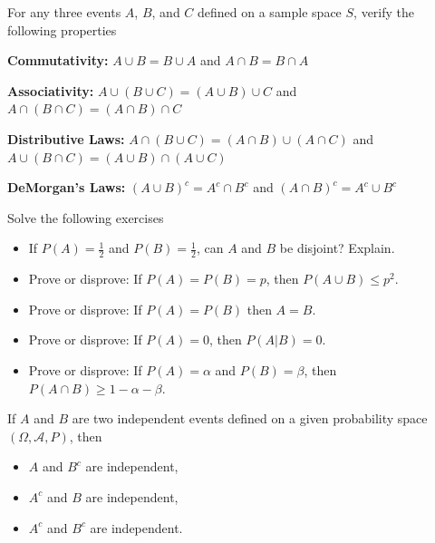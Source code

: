 \begin{Ejer} For any three events $A$, $B$, and $C$ defined on a sample space $S$, verify the following properties 

\textbf{Commutativity:} $A \cup B = B \cup A$ and $A \cap B = B \cap A$

\textbf{Associativity:} $A \cup (B \cup C) = (A \cup B) \cup C$ and $A \cap (B \cap C) = (A \cap B) \cap C$

\textbf{Distributive Laws:} $A \cap (B \cup C) = (A \cap B) \cup (A \cap C)$ and $A \cup (B \cap C) = (A \cup B) \cap (A \cup C)$

\textbf{DeMorgan's Laws:} $(A \cup B)^c = A^c \cap B^c$ and $(A \cap B)^c = A^c \cup B^c$
\end{Ejer}


\begin{Ejer}
Solve the following exercises
\begin{itemize}

\item[a) ] If $P(A)=\tfrac12$ and $P(B)=\tfrac12$, can $A$ and $B$ be disjoint? Explain.

\item[b) ] Prove or disprove: If $P(A)=P(B)=p$, then $P(A\cup B)\le p^2$.

\item[c) ] Prove or disprove: If $P(A)=P(B)$ then $A=B$.

\item[d) ] Prove or disprove: If $P(A)=0$, then $P(A|B)=0$.

\item[e) ] Prove or disprove: If $P(A)=\alpha$ and $P(B)=\beta$, then $P(A\cap B)\ge 1-\alpha-\beta$.

\end{itemize}
\end{Ejer}

\begin{Ejer} If $A$ and $B$ are two independent events defined on a given probability space $(\Omega,\mathcal{A},P)$, then

\begin{itemize}

\item[a) ] $A$ and $B^{c}$ are independent,

\item[b) ] $A^{c}$ and $B$ are independent,

\item[c) ] $A^{c}$ and $B^{c}$ are independent.

\end{itemize}
\end{Ejer}

